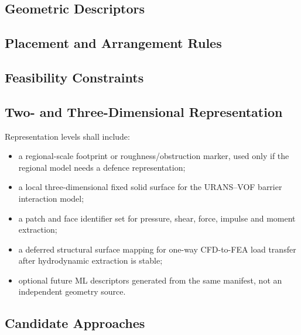 
\subsection{Geometric Descriptors}
\label{sec:res-geo-rep-geometric-descriptors}


\subsection{Placement and Arrangement Rules}
\label{sec:res-geo-rep-placement-arrangement-rules}


\subsection{Feasibility Constraints}
\label{sec:res-geo-rep-feasibility-constraints}


\subsection{Two- and Three-Dimensional Representation}
\label{sec:res-geo-rep-two-three-dimensional-representation}

Representation levels shall include:

\begin{itemize}
  \item a regional-scale footprint or roughness/obstruction marker,
    used only if the regional model needs a defence representation;
  \item a local three-dimensional fixed solid surface for the
    URANS--VOF barrier interaction model;
  \item a patch and face identifier set for pressure, shear, force,
    impulse and moment extraction;
  \item a deferred structural surface mapping for one-way CFD-to-FEA
    load transfer after hydrodynamic extraction is stable;
  \item optional future ML descriptors generated from the same
    manifest, not an independent geometry source.
\end{itemize}

\subsection{Candidate Approaches}
\label{sec:res-geo-rep-candidate-approaches}

